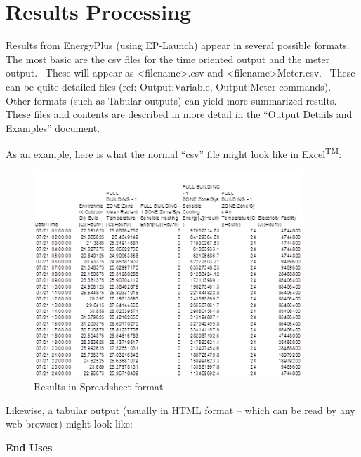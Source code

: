 \section{Results Processing}\label{results-processing}

Results from EnergyPlus (using EP-Launch) appear in several possible formats.~ The most basic are the csv files for the time oriented output and the meter output.~ These will appear as \textless{}filename\textgreater{}.csv and \textless{}filename\textgreater{}Meter.csv.~ These can be quite detailed files (ref: Output:Variable, Output:Meter commands).~ Other formats (such as Tabular outputs) can yield more summarized results.~ These files and contents are described in more detail in the ``\href{file:///E:/Docs4PDFs/OutputDetailsAndExamples.pdf}{Output Details and Examples}'' document.

As an example, here is what the normal ``csv'' file might look like in Excel\textsuperscript{TM}:

\begin{figure}[hbtp] %
\centering
\includegraphics[width=0.9\textwidth, height=0.9\textheight, keepaspectratio=true]{media/image023.png}
\caption{Results in Spreadsheet format \protect \label{fig:results-in-spreadsheet-format}}
\end{figure}

Likewise, a tabular output (usually in HTML format -- which can be read by any web browser) might look like:

\textbf{End Uses}

